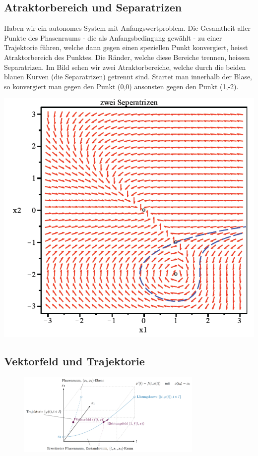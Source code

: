 \subsection{Atraktorbereich und Separatrizen}
Haben wir ein autonomes System mit Anfangswertproblem. Die Gesamtheit aller Punkte des Phasenraums - die als Anfangsbedingung gewählt - zu einer Trajektorie führen, welche dann gegen einen speziellen Punkt konvergiert, heisst Atraktorbereich des Punktes. 
Die Ränder, welche diese Bereiche trennen, heissen Separatrizen. 
Im Bild sehen wir zwei Atraktorbereiche, welche durch die beiden blauen Kurven (die Separatrizen) getrennt sind. 
Startet man innerhalb der Blase, so konvergiert man gegen den Punkt (0,0) ansonsten gegen den Punkt (1,-2). 
\begin{minipage}[h!]{0.35\textwidth}
	\includegraphics[width=1\textwidth]{images/Atraktorbereich.png}
\end{minipage}

\subsection{Vektorfeld und Trajektorie}
\begin{figure}[h!]
	\centering
	\includegraphics[width=0.8\textwidth]{./images/phasenraum.png}
\end{figure}


